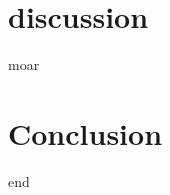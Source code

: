 \documentclass{article}
\begin{document}
\section{discussion}

moar

\section{Conclusion}
end
\end{document}

